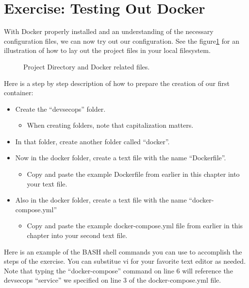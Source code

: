 \section{Exercise: Testing Out Docker}

\justify{}
With Docker properly installed and an understanding of the necessary configuration files, we can now try out our configuration.
See the  figure\ref{githubdirectory} for an illustration of how to lay out the project files in your local filesystem.

\begin{figure}[!htb]
  \centering
  
  \caption{Project Directory and Docker related files.}
\label{githubdirectory}
\end{figure}

\clearpage
\justify{}
Here is a step by step description of how to prepare the creation of
our first container:

\begin{itemize}
  \item Create the ``devsecops'' folder.
        \begin{itemize}
          \item When creating folders, note that capitalization matters.
        \end{itemize}
  \item In that folder, create another folder called ``docker''.
  \item Now in the docker folder, create a text file with the name ``Dockerfile''.
        \begin{itemize}
          \item
                Copy and paste the example Dockerfile from earlier in this chapter
                into your text file.
        \end{itemize}
  \item Also in the docker folder, create a text file with the name ``docker-compose.yml''
        \begin{itemize}
          \item Copy and paste the example docker-compose.yml file from earlier
          in this chapter into your second text file.
        \end{itemize}
\end{itemize}

\justify{}
Here is an example of the BASH shell commands you can use to accomplish
the steps of the exercise. You can substitue vi for your favorite text
editor as needed. Note that typing the ``docker-compose'' command on line
6 will reference the devsecops ``service'' we specified on line 3 of the
docker-compose.yml file.


